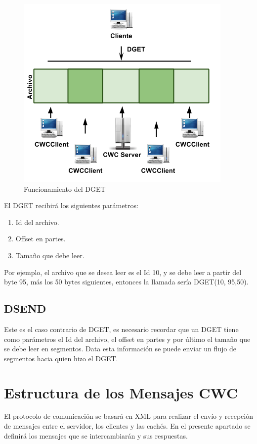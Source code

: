 \begin{figure}
  \centering
    \includegraphics[scale=0.75]{gfx/DGET}
  \caption{Funcionamiento del DGET}
  \label{DGET}
\end{figure}


El DGET recibirá los siguientes parámetros:

\begin{enumerate}
\item Id del archivo.
\item Offset en partes.
\item Tamaño que debe leer.
\end{enumerate}

Por ejemplo, el archivo que se desea leer es el Id 10, y se debe leer a partir del byte 95, más los 50 bytes siguientes, entonces la llamada sería DGET(10, 95,50).

\subsection{DSEND}
Este es el caso contrario de DGET, es necesario recordar que un DGET tiene como parámetros el Id del archivo, el offset en partes y por último el tamaño que se debe leer en segmentos. Data esta información se puede enviar un flujo de segmentos hacia quien hizo el DGET.

\section{Estructura de los Mensajes CWC}
\label{sec:estructura_protocolo_cwc}

El protocolo de comunicación se basará en XML para realizar el envío y recepción de mensajes entre el servidor, los clientes y las cachés. En el presente apartado se definirá los mensajes que se intercambiarán y sus respuestas.

